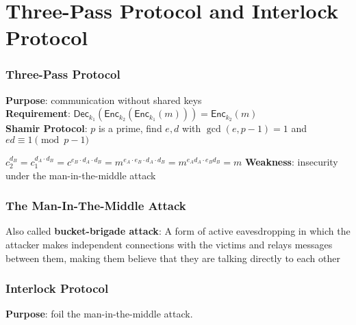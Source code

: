 \section{Three-Pass Protocol and Interlock Protocol}
\begin{frame}\frametitle{Three-Pass Protocol}
\textbf{Purpose}: communication without shared keys\\
\textbf{Requirement}: $\mathsf{Dec}_{k_1}(\mathsf{Enc}_{k_2}(\mathsf{Enc}_{k_1}(m))) = \mathsf{Enc}_{k_2}(m)$\\
\textbf{Shamir Protocol}: $p$ is a prime, find $e,d$ with $\gcd(e,p-1)=1$ and $ed \equiv 1 \pmod{p-1}$

\begin{figure}
\begin{center}

\end{center}
\end{figure}
$c_2^{d_B} = c_1^{d_A\cdot d_B} = c^{e_B\cdot d_A\cdot d_B} = m^{e_A\cdot e_B\cdot d_A\cdot d_B} = m^{e_Ad_A\cdot e_Bd_B} = m$
\textbf{Weakness}: insecurity under the man-in-the-middle attack
\end{frame}
\begin{frame}\frametitle{The Man-In-The-Middle Attack}
Also called \textbf{bucket-brigade attack}: A form of active eavesdropping in which the attacker makes independent connections with the victims and relays messages between them, making them believe that they are talking directly to each other
\begin{figure}
\begin{center}

\end{center}
\end{figure}
\end{frame}
\begin{frame}\frametitle{Interlock Protocol}
\textbf{Purpose}: foil the man-in-the-middle attack.
\begin{figure}
\begin{center}

\end{center}
\end{figure}
\end{frame}
